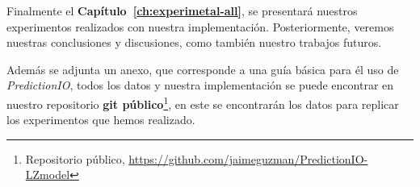 Finalmente el \textbf{Capítulo~\ref{ch:experimetal-all}}, se presentará nuestros experimentos realizados con nuestra implementación. Posteriormente, veremos nuestras conclusiones y discusiones, como también nuestro trabajos futuros.





Además se adjunta un anexo, que corresponde a una guía básica para él uso de \emph{PredictionIO}, todos los datos y nuestra implementación se puede encontrar en nuestro repositorio \textbf{git público}\footnote{Repositorio público, \url{https://github.com/jaimeguzman/PredictionIO-LZmodel}}, en este se encontrarán los datos para replicar los experimentos que hemos realizado. 



